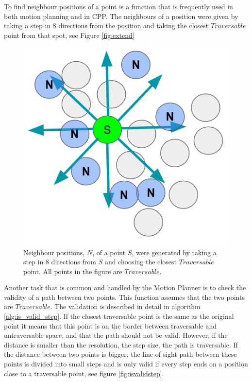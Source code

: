 To find neighbour positions of a point is a function that is frequently used in both motion planning and in CPP. The neighbours of a position were given by taking a step in 8 directions from the position and taking the closest $Traversable$ point from that spot, see Figure \ref{fig:extend}

\begin{figure}
    \centering
    \includegraphics[width=\0.5\textwidth]{figures/neighbours.png}
    \caption{Neighbour positions, $N$, of a point $S$, were generated by taking a step in 8 directions from $S$ and choosing the closest $Traversable$ point. All points in the figure are $Traversable$.}
    \label{fig:my_label}
\end{figure}

Another task that is common and handled by the Motion Planner is to check the validity of a path between two points. This function assumes that the two points are $Traversable$. The validation is described in detail in algorithm \ref{alg:is_valid_step}. If the closest traversable point is the same as the original point it means that this point is on the border between traversable and untraversable space, and that the path should not be valid. However, if the distance is smaller than the resolution, the step size, the path is traversable. If the distance between two points is bigger, the line-of-sight path between these points is divided into small steps and is only valid if every step ends on a position close to a traversable point, see figure \ref{fig:isvalidstep}. 

